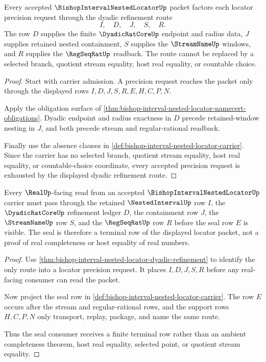\begin{theorem}
\label{thm:bishop-interval-nested-locator-dyadic-refinement}
Every accepted $\BishopIntervalNestedLocatorUp$ packet factors each locator precision request through the dyadic refinement route
$$
I,\quad D,\quad J,\quad S,\quad R.
$$
The row $D$ supplies the finite $\DyadicRatCoreUp$ endpoint and radius data, $J$ supplies retained nested containment, $S$ supplies the $\StreamNameUp$ windows, and $R$ supplies the $\RegSeqRatUp$ readback. The route cannot be replaced by a selected branch, quotient stream equality, host real equality, or countable choice.
\end{theorem}
\begin{proof}
Start with carrier admission. A precision request reaches the packet only through the displayed rows $I,D,J,S,R,E,H,C,P,N$.

Apply the obligation surface of \autoref{thm:bishop-interval-nested-locator-namecert-obligations}. Dyadic endpoint and radius exactness in $D$ precede retained-window nesting in $J$, and both precede stream and regular-rational readback.

Finally use the absence clauses in \autoref{def:bishop-interval-nested-locator-carrier}. Since the carrier has no selected branch, quotient stream equality, host real equality, or countable-choice coordinate, every accepted precision request is exhausted by the displayed dyadic refinement route.
\end{proof}

\begin{theorem}
\label{thm:bishop-interval-nested-locator-real-seal-route}
Every $\RealUp$-facing read from an accepted $\BishopIntervalNestedLocatorUp$ carrier must pass through the retained $\NestedIntervalUp$ row $I$, the $\DyadicRatCoreUp$ refinement ledger $D$, the containment row $J$, the $\StreamNameUp$ row $S$, and the $\RegSeqRatUp$ row $R$ before the seal row $E$ is visible. The seal is therefore a terminal row of the displayed locator packet, not a proof of real completeness or host equality of real numbers.
\end{theorem}
\begin{proof}
Use \autoref{thm:bishop-interval-nested-locator-dyadic-refinement} to identify the only route into a locator precision request. It places $I,D,J,S,R$ before any real-facing consumer can read the packet.

Now project the seal row in \autoref{def:bishop-interval-nested-locator-carrier}. The row $E$ occurs after the stream and regular-rational rows, and the support rows $H,C,P,N$ only transport, replay, package, and name the same route.

Thus the seal consumer receives a finite terminal row rather than an ambient completeness theorem, host real equality, selected point, or quotient stream equality.
\end{proof}

